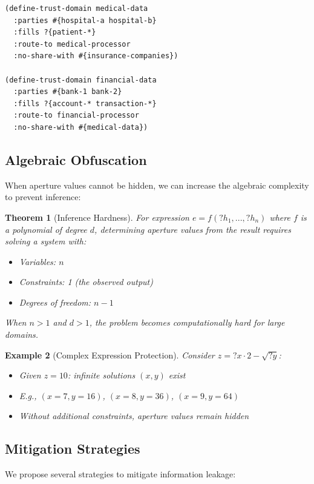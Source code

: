 \documentclass[12pt]{article}
\newtheorem{theorem}{Theorem}
\newtheorem{example}[theorem]{Example}
\begin{document}
\begin{lstlisting}
(define-trust-domain medical-data
  :parties #{hospital-a hospital-b}
  :fills ?{patient-*}
  :route-to medical-processor
  :no-share-with #{insurance-companies})

(define-trust-domain financial-data
  :parties #{bank-1 bank-2}
  :fills ?{account-* transaction-*}
  :route-to financial-processor
  :no-share-with #{medical-data})
\end{lstlisting}

\subsection{Algebraic Obfuscation}

When aperture values cannot be hidden, we can increase the algebraic complexity to prevent inference:

\begin{theorem}[Inference Hardness]
For expression $e = f(?h_1, ..., ?h_n)$ where $f$ is a polynomial of degree $d$, determining aperture values from the result requires solving a system with:
\begin{itemize}
    \item Variables: $n$
    \item Constraints: 1 (the observed output)
    \item Degrees of freedom: $n - 1$
\end{itemize}
When $n > 1$ and $d > 1$, the problem becomes computationally hard for large domains.
\end{theorem}

\begin{example}[Complex Expression Protection]
Consider $z = ?x \cdot 2 - \sqrt{?y}$:
\begin{itemize}
    \item Given $z = 10$: infinite solutions $(x,y)$ exist
    \item E.g., $(x=7, y=16)$, $(x=8, y=36)$, $(x=9, y=64)$
    \item Without additional constraints, aperture values remain hidden
\end{itemize}
\end{example}

\subsection{Mitigation Strategies}

We propose several strategies to mitigate information leakage:
\end{document}
